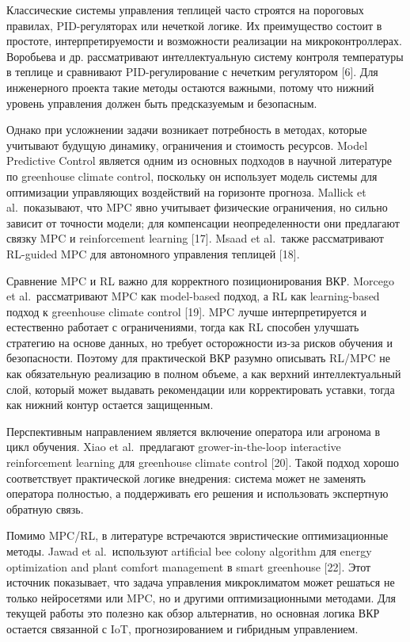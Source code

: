 \documentclass[a4paper,14pt]{extarticle}
\begin{document}
Классические системы управления теплицей часто строятся на пороговых
правилах, PID-регуляторах или нечеткой логике. Их преимущество состоит в
простоте, интерпретируемости и возможности реализации на
микроконтроллерах. Воробьева и др. рассматривают интеллектуальную
систему контроля температуры в теплице и сравнивают PID-регулирование с
нечетким регулятором {[}6{]}. Для инженерного проекта такие методы
остаются важными, потому что нижний уровень управления должен быть
предсказуемым и безопасным.

Однако при усложнении задачи возникает потребность в методах, которые
учитывают будущую динамику, ограничения и стоимость ресурсов. Model
Predictive Control является одним из основных подходов в научной
литературе по greenhouse climate control, поскольку он использует модель
системы для оптимизации управляющих воздействий на горизонте прогноза.
Mallick et al.~показывают, что MPC явно учитывает физические
ограничения, но сильно зависит от точности модели; для компенсации
неопределенности они предлагают связку MPC и reinforcement learning
{[}17{]}. Msaad et al.~также рассматривают RL-guided MPC для автономного
управления теплицей {[}18{]}.

Сравнение MPC и RL важно для корректного позиционирования ВКР. Morcego
et al.~рассматривают MPC как model-based подход, а RL как learning-based
подход к greenhouse climate control {[}19{]}. MPC лучше интерпретируется
и естественно работает с ограничениями, тогда как RL способен улучшать
стратегию на основе данных, но требует осторожности из-за рисков
обучения и безопасности. Поэтому для практической ВКР разумно описывать
RL/MPC не как обязательную реализацию в полном объеме, а как верхний
интеллектуальный слой, который может выдавать рекомендации или
корректировать уставки, тогда как нижний контур остается защищенным.

Перспективным направлением является включение оператора или агронома в
цикл обучения. Xiao et al.~предлагают grower-in-the-loop interactive
reinforcement learning для greenhouse climate control {[}20{]}. Такой
подход хорошо соответствует практической логике внедрения: система может
не заменять оператора полностью, а поддерживать его решения и
использовать экспертную обратную связь.

Помимо MPC/RL, в литературе встречаются эвристические оптимизационные
методы. Jawad et al.~используют artificial bee colony algorithm для
energy optimization and plant comfort management в smart greenhouse
{[}22{]}. Этот источник показывает, что задача управления микроклиматом
может решаться не только нейросетями или MPC, но и другими
оптимизационными методами. Для текущей работы это полезно как обзор
альтернатив, но основная логика ВКР остается связанной с IoT,
прогнозированием и гибридным управлением.
\end{document}
